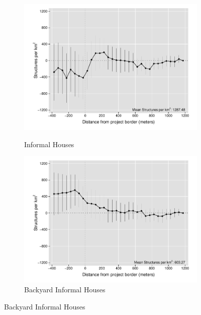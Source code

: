 \documentclass[12pt]{article}
\begin{document}
\begin{figure}[t!]
\begin{subfigure}[b]{0.49\textwidth}
            \label{fig:DDDformal}
        \end{subfigure}
        \vskip 1mm \vskip 0pt
        \begin{subfigure}[b]{0.49\textwidth}
            \centering
            \caption[]{\small Informal Houses}
            \vspace{-1mm}
            \includegraphics[width=\textwidth,trim={.5cm .3cm .3cm 0cm}, clip=true]{figures/distplotDDD_bblu_inf_admin.pdf}
            \label{fig:DDDinformal}
        \end{subfigure}
        \hfill
        \begin{subfigure}[b]{0.49\textwidth}  
            \centering
            \caption[]{\small Backyard Informal Houses}  
            \vspace{-1mm}
            \includegraphics[width=\textwidth,trim={.5cm .3cm .3cm 0cm}, clip=true]{figures/distplotDDD_bblu_inf_backyard_admin}

\end{subfigure}
\end{figure}
\end{document}
